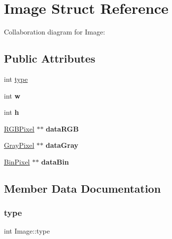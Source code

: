 \hypertarget{struct_image}{}\section{Image Struct Reference}
\label{struct_image}


Collaboration diagram for Image\+:
\subsection*{Public Attributes}
\begin{DoxyCompactItemize}
\item 
int \hyperlink{struct_image_a6f96e6566aefb474f43e615f87bcae33}{type}
\item 
\mbox{\label{struct_image_a5a1c5528c889b0438bc2dc0c0ee94dbe}} 
int {\bfseries w}
\item 
\mbox{\label{struct_image_aead13dbc461159381773fff06824e651}} 
int {\bfseries h}
\item 
\mbox{\label{struct_image_ac33e1f924b451afc099b1564267b460f}} 
\hyperlink{struct_r_g_b_pixel}{R\+G\+B\+Pixel} $\ast$$\ast$ {\bfseries data\+R\+GB}
\item 
\mbox{\label{struct_image_af91206109ed69d57aad15da082315c10}} 
\hyperlink{struct_gray_pixel}{Gray\+Pixel} $\ast$$\ast$ {\bfseries data\+Gray}
\item 
\mbox{\label{struct_image_ab1900045ce16f4817ba49db02b93d8a5}} 
\hyperlink{struct_bin_pixel}{Bin\+Pixel} $\ast$$\ast$ {\bfseries data\+Bin}
\end{DoxyCompactItemize}


\subsection{Member Data Documentation}
\mbox{\label{struct_image_a6f96e6566aefb474f43e615f87bcae33}} 
\subsubsection{\texorpdfstring{type}{type}}
{\footnotesize\ttfamily int Image\+::type}

